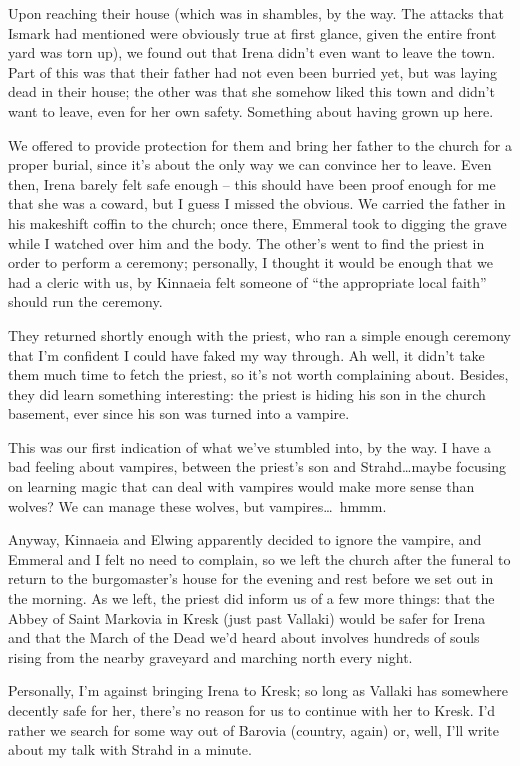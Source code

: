Upon reaching their house (which was in shambles, by the way. The attacks that Ismark had mentioned were obviously true at first glance, given the entire front yard was torn up), we found out that Irena didn't even want to leave the town. Part of this was that their father had not even been burried yet, but was laying dead in their house; the other was that she somehow liked this town and didn't want to leave, even for her own safety. Something about having grown up here.

We offered to provide protection for them and bring her father to the church for a proper burial, since it's about the only way we can convince her to leave. Even then, Irena barely felt safe enough -- this should have been proof enough for me that she was a coward, but I guess I missed the obvious. We carried the father in his makeshift coffin to the church; once there, Emmeral took to digging the grave while I watched over him and the body. The other's went to find the priest in order to perform a ceremony; personally, I thought it would be enough that we had a cleric with us, by Kinnaeia felt someone of ``the appropriate local faith'' should run the ceremony.

They returned shortly enough with the priest, who ran a simple enough ceremony that I'm confident I could have faked my way through. Ah well, it didn't take them much time to fetch the priest, so it's not worth complaining about. Besides, they did learn something interesting: the priest is hiding his son in the church basement, ever since his son was turned into a vampire.

This was our first indication of what we've stumbled into, by the way. I have a bad feeling about vampires, between the priest's son and Strahd\dots maybe focusing on learning magic that can deal with vampires would make more sense than wolves? We can manage these wolves, but vampires\dots\ hmmm.

Anyway, Kinnaeia and Elwing apparently decided to ignore the vampire, and Emmeral and I felt no need to complain, so we left the church after the funeral to return to the burgomaster's house for the evening and rest before we set out in the morning. As we left, the priest did inform us of a few more things: that the Abbey of Saint Markovia in Kresk (just past Vallaki) would be safer for Irena and that the March of the Dead we'd heard about involves hundreds of souls rising from the nearby graveyard and marching north every night.

Personally, I'm against bringing Irena to Kresk; so long as Vallaki has somewhere decently safe for her, there's no reason for us to continue with her to Kresk. I'd rather we search for some way out of Barovia (country, again) or, well, I'll write about my talk with Strahd in a minute.

